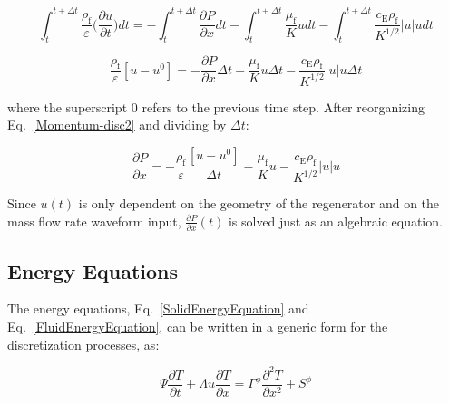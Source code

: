 \documentclass[review,preprint,12pt]{elsarticle}
\begin{document}
\begin{equation}
\int_{t}^{t+\Delta t}\frac{\rho_\textrm{f}}{\varepsilon}\Biggl(\frac{\partial u}{\partial t}\Biggr) dt = -\int_{t}^{t+\Delta t}\frac{\partial P}{\partial x} dt - \int_{t}^{t+\Delta t}\frac{\mu_\textrm{f}}{K}u dt - \int_{t}^{t+\Delta t}\frac{c_\textrm{E}\rho_\textrm{f}}{K^{1/2}}|u|u dt
\label{Momentum-disc}
\end{equation}

\begin{equation}
\frac{\rho_\textrm{f}}{\varepsilon}[u-u^0] = -\frac{\partial P}{\partial x}\Delta t - \frac{\mu_\textrm{f}}{K}u\Delta t - \frac{c_\textrm{E}\rho_\textrm{f}}{K^{1/2}}|u|u \Delta t
\label{Momentum-disc2}
\end{equation}

\noindent where the superscript $0$ refers to the previous time step. After reorganizing Eq.~\eqref{Momentum-disc2} and dividing by $\Delta t$:

\begin{equation}
 \frac{\partial P}{\partial x} = -\frac{\rho_\textrm{f}}{\varepsilon}\frac{[u-u^0]}{\Delta t} - \frac{\mu_\textrm{f}}{K}u - \frac{c_\textrm{E}\rho_\textrm{f}}{K^{1/2}}|u|u 
\label{Momentum-disc3}
\end{equation}



Since $u(t)$ is only dependent on the geometry of the regenerator and on the mass flow rate waveform input, $\frac{\partial P}{\partial x}(t)$ is solved just as an algebraic equation.


\subsection{Energy Equations}
\label{sec:disc-solid_fluid}

The energy equations, Eq.~\eqref{SolidEnergyEquation} and Eq.~\eqref{FluidEnergyEquation}, can be written in a generic form for the discretization processes, as:

\begin{equation}
\Psi\frac{\partial T}{\partial t} + \Lambda u \frac{\partial T}{\partial x} = \Gamma^{\phi} \frac{\partial^{2}T}{\partial x^2} + S^{\phi}
\label{1D_GenericForm}
\end{equation}
\end{document}
